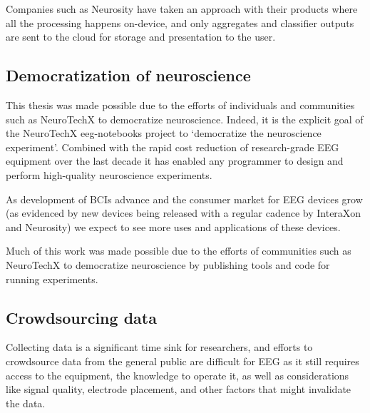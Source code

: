 \documentclass[a4paper]{article}
\begin{document}
\begin{refsection}
        Companies such as Neurosity have taken an approach with their products where all the processing happens on-device, and only aggregates and classifier outputs are sent to the cloud for storage and presentation to the user.



    \subsection{Democratization of neuroscience}


        This thesis was made possible due to the efforts of individuals and communities such as NeuroTechX to democratize neuroscience. Indeed, it is the explicit goal of the NeuroTechX eeg-notebooks project to `democratize the neuroscience experiment'. Combined with the rapid cost reduction of research-grade EEG equipment over the last decade it has enabled any programmer to design and perform high-quality neuroscience experiments.


        As development of BCIs advance and the consumer market for EEG devices grow (as evidenced by new devices being released with a regular cadence by InteraXon and Neurosity) we expect to see more uses and applications of these devices.

        Much of this work was made possible due to the efforts of communities such as NeuroTechX to democratize neuroscience by publishing tools and code for running experiments.

    \subsection{Crowdsourcing data}

        Collecting data is a significant time sink for researchers, and efforts to crowdsource data from the general public are difficult for EEG as it still requires access to the equipment, the knowledge to operate it, as well as considerations like signal quality, electrode placement, and other factors that might invalidate the data.


\end{refsection}
\end{document}
